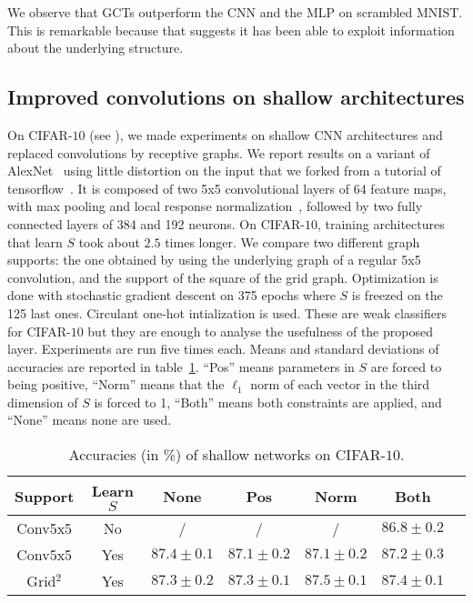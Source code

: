 We observe that GCTs outperform the CNN and the MLP on scrambled MNIST. This is remarkable because that suggests it has been able to exploit information about the underlying structure.

\subsection{Improved convolutions on shallow architectures}

On CIFAR-$10$ (see ), we made experiments on shallow CNN architectures and replaced convolutions by receptive graphs. We report results on a variant of AlexNet~\citep{krizhevsky2012imagenet} using little distortion on the input that we forked from a tutorial of tensorflow~\citep{tensorflow2015-whitepaper}.
It is composed of two 5x5 convolutional layers of 64 feature maps, with max pooling and local response normalization~\citep{krizhevsky2012imagenet}, followed by two fully connected layers of 384 and 192 neurons.
On CIFAR-$10$, training architectures that learn $S$ took about $2.5$ times longer.
We compare two different graph supports: the one obtained by using the underlying graph of a regular 5x5 convolution, and the support of the square of the grid graph. Optimization is done with stochastic gradient descent on 375 epochs where $S$ is freezed on the 125 last ones. Circulant one-hot intialization is used. These are weak classifiers for CIFAR-$10$ but they are enough to analyse the usefulness of the proposed layer.
Experiments are run five times each. Means and standard deviations of accuracies are reported in table~\ref{cifar}. ``Pos'' means parameters in $S$ are forced to being positive, ``Norm'' means that the $\ell_1$ norm of each vector in the third dimension of $S$ is forced to 1, ``Both'' means both constraints are applied, and ``None'' means none are used.

\begin{table}[H]
  \caption{Accuracies (in \%) of shallow networks on CIFAR-$10$.}
  \begin{center}
    \bgroup
    \def\arraystretch{1.5}%
    \begin{tabular}{|c|c|c|c|c|c|c|}
      \hline
      Support & Learn $S$ & None & Pos & Norm & Both\\
      \hline
      \hline
      Conv5x5 & No & / & / & / & $86.8 \pm 0.2$\\
      \hline
      Conv5x5 & Yes & $87.4 \pm 0.1$ & $87.1 \pm 0.2$ & $87.1 \pm 0.2$ & $87.2 \pm 0.3$\\
      \hline
      Grid$^2$ & Yes & $87.3 \pm 0.2$ & $87.3 \pm 0.1$ & $87.5 \pm 0.1$ & $87.4 \pm 0.1$\\
      \hline
    \end{tabular}
    \egroup
  \end{center}
  \label{cifar}
\end{table}

